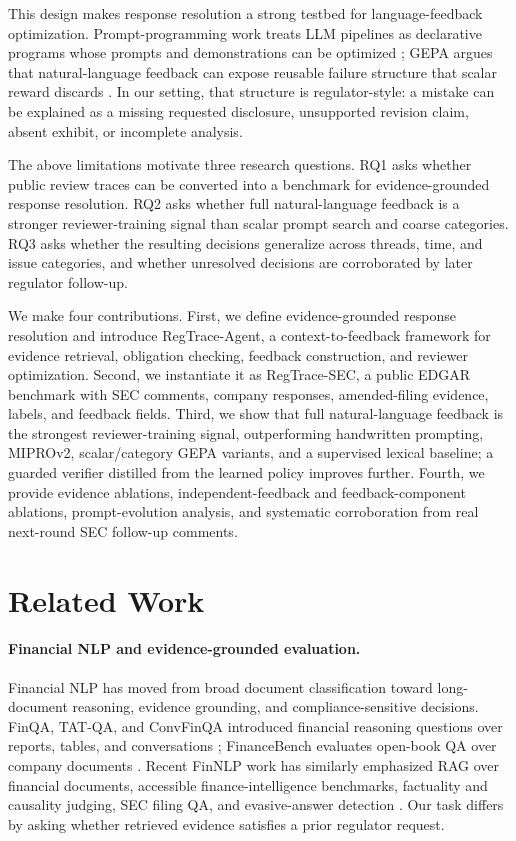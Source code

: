 \documentclass[11pt]{article}
\newcommand{\task}{evidence-grounded response resolution}
\newcommand{\dataset}{RegTrace-SEC}
\newcommand{\framework}{RegTrace-Agent}
\begin{document}
This design makes response resolution a strong testbed for language-feedback optimization. Prompt-programming work treats LLM pipelines as declarative programs whose prompts and demonstrations can be optimized \citep{khattab2023dspy}; GEPA argues that natural-language feedback can expose reusable failure structure that scalar reward discards \citep{agrawal2026gepa}. In our setting, that structure is regulator-style: a mistake can be explained as a missing requested disclosure, unsupported revision claim, absent exhibit, or incomplete analysis.

The above limitations motivate three research questions. RQ1 asks whether public review traces can be converted into a benchmark for evidence-grounded response resolution. RQ2 asks whether full natural-language feedback is a stronger reviewer-training signal than scalar prompt search and coarse categories. RQ3 asks whether the resulting decisions generalize across threads, time, and issue categories, and whether unresolved decisions are corroborated by later regulator follow-up.

We make four contributions. First, we define \task{} and introduce \framework{}, a context-to-feedback framework for evidence retrieval, obligation checking, feedback construction, and reviewer optimization. Second, we instantiate it as \dataset{}, a public EDGAR benchmark with SEC comments, company responses, amended-filing evidence, labels, and feedback fields. Third, we show that full natural-language feedback is the strongest reviewer-training signal, outperforming handwritten prompting, MIPROv2, scalar/category GEPA variants, and a supervised lexical baseline; a guarded verifier distilled from the learned policy improves further. Fourth, we provide evidence ablations, independent-feedback and feedback-component ablations, prompt-evolution analysis, and systematic corroboration from real next-round SEC follow-up comments.

\section{Related Work}

\paragraph{Financial NLP and evidence-grounded evaluation.}
Financial NLP has moved from broad document classification toward long-document reasoning, evidence grounding, and compliance-sensitive decisions. FinQA, TAT-QA, and ConvFinQA introduced financial reasoning questions over reports, tables, and conversations \citep{chen2021finqa,zhu2021tatqa,chen2022convfinqa}; FinanceBench evaluates open-book QA over company documents \citep{islam2023financebench}. Recent FinNLP work has similarly emphasized RAG over financial documents, accessible finance-intelligence benchmarks, factuality and causality judging, SEC filing QA, and evasive-answer detection \citep{lithgow2025rag,klimaszewski2025avenibench,lai2025secqa,nuaimi2025evasive,wu2025nli}. Our task differs by asking whether retrieved evidence satisfies a prior regulator request.
\end{document}
